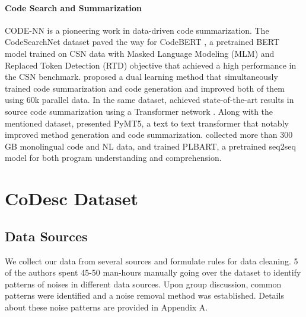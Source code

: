 \documentclass[11pt,a4paper]{article}
\begin{document}
\paragraph{Code Search and Summarization}
CODE-NN \cite{iyer-CODENN} is a pioneering work in data-driven code summarization.
The CodeSearchNet dataset paved the way for CodeBERT \cite{codebert}, a pretrained BERT \cite{bert} model trained on CSN data with Masked Language Modeling (MLM) \cite{bert} and Replaced Token Detection (RTD) \cite{clark2020electra} objective that achieved a high performance in the CSN benchmark.  \citet{wei2019code} proposed a dual learning method that simultaneously trained code summarization and code generation and improved both of them using 60k parallel data. In the same dataset, \citet{ncs} achieved state-of-the-art results in source code summarization using a Transformer network \cite{transformer}. Along with the mentioned dataset, \citet{pymt5} presented PyMT5, a text to text transformer that notably improved method generation and code summarization. \citet{plbart} collected more than 300 GB monolingual code and NL data, and trained PLBART, a pretrained seq2seq model for both program understanding and comprehension. 

%
 
\section{CoDesc Dataset}
\label{sec:codesc}



\subsection{Data Sources}
\label{subsec:data-sources}


We collect our data from several sources and formulate rules for data cleaning. 5 of the authors spent 45-50 man-hours manually going over the dataset to identify patterns of noises in different data sources. Upon group discussion, common patterns were identified and a noise removal method was established. Details about these noise patterns are provided in Appendix A.
\end{document}
